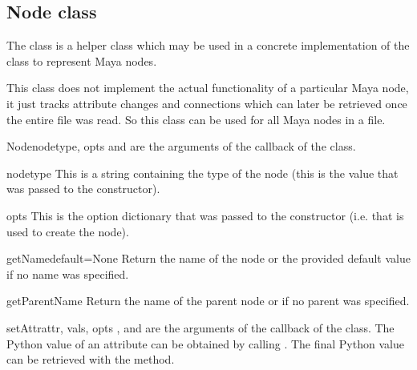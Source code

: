 \subsection{Node class}

The  class is a helper class which may be used in a
concrete implementation of the  class to represent 
Maya nodes.

This class does not implement the actual functionality of a particular
Maya node, it just tracks attribute changes and connections which can
later be retrieved once the entire file was read. So this class can be
used for all Maya nodes in a file.

\begin{classdesc}{Node}{nodetype, opts}
   and  are the arguments of the 
   callback of the  class.
\end{classdesc}

\begin{memberdesc}{nodetype}
This is a string containing the type of the node (this is the value
that was passed to the constructor).
\end{memberdesc}

\begin{memberdesc}{opts}
This is the option dictionary that was passed to the constructor
(i.e. that is used to create the node).
\end{memberdesc}

\begin{methoddesc}{getName}{default=None}
Return the name of the node or the provided default value if no name 
was specified.
\end{methoddesc}

\begin{methoddesc}{getParentName}{}
Return the name of the parent node or  if no parent was specified.
\end{methoddesc}

\begin{methoddesc}{setAttr}{attr, vals, opts}
,  and  are the arguments of the 
 callback of the  class. The Python
value of an attribute can be obtained by calling .
The final Python value can be retrieved with the 
 method.
\end{methoddesc}


